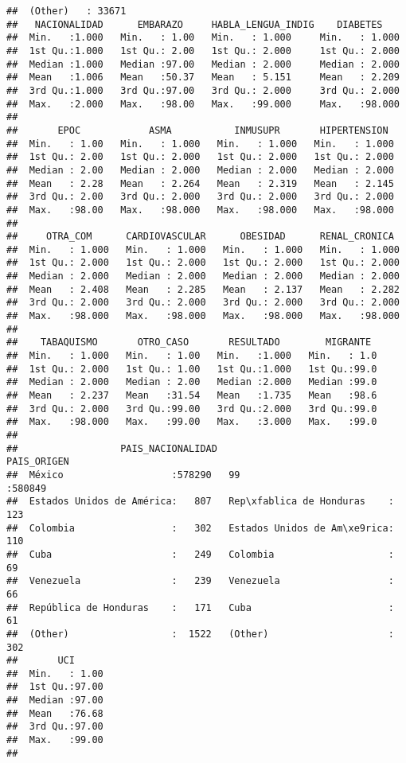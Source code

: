 \documentclass[]{article}
\begin{document}
\begin{verbatim}
##  (Other)   : 33671                                                    
##   NACIONALIDAD      EMBARAZO     HABLA_LENGUA_INDIG    DIABETES     
##  Min.   :1.000   Min.   : 1.00   Min.   : 1.000     Min.   : 1.000  
##  1st Qu.:1.000   1st Qu.: 2.00   1st Qu.: 2.000     1st Qu.: 2.000  
##  Median :1.000   Median :97.00   Median : 2.000     Median : 2.000  
##  Mean   :1.006   Mean   :50.37   Mean   : 5.151     Mean   : 2.209  
##  3rd Qu.:1.000   3rd Qu.:97.00   3rd Qu.: 2.000     3rd Qu.: 2.000  
##  Max.   :2.000   Max.   :98.00   Max.   :99.000     Max.   :98.000  
##                                                                     
##       EPOC            ASMA           INMUSUPR       HIPERTENSION   
##  Min.   : 1.00   Min.   : 1.000   Min.   : 1.000   Min.   : 1.000  
##  1st Qu.: 2.00   1st Qu.: 2.000   1st Qu.: 2.000   1st Qu.: 2.000  
##  Median : 2.00   Median : 2.000   Median : 2.000   Median : 2.000  
##  Mean   : 2.28   Mean   : 2.264   Mean   : 2.319   Mean   : 2.145  
##  3rd Qu.: 2.00   3rd Qu.: 2.000   3rd Qu.: 2.000   3rd Qu.: 2.000  
##  Max.   :98.00   Max.   :98.000   Max.   :98.000   Max.   :98.000  
##                                                                    
##     OTRA_COM      CARDIOVASCULAR      OBESIDAD      RENAL_CRONICA   
##  Min.   : 1.000   Min.   : 1.000   Min.   : 1.000   Min.   : 1.000  
##  1st Qu.: 2.000   1st Qu.: 2.000   1st Qu.: 2.000   1st Qu.: 2.000  
##  Median : 2.000   Median : 2.000   Median : 2.000   Median : 2.000  
##  Mean   : 2.408   Mean   : 2.285   Mean   : 2.137   Mean   : 2.282  
##  3rd Qu.: 2.000   3rd Qu.: 2.000   3rd Qu.: 2.000   3rd Qu.: 2.000  
##  Max.   :98.000   Max.   :98.000   Max.   :98.000   Max.   :98.000  
##                                                                     
##    TABAQUISMO       OTRO_CASO       RESULTADO        MIGRANTE   
##  Min.   : 1.000   Min.   : 1.00   Min.   :1.000   Min.   : 1.0  
##  1st Qu.: 2.000   1st Qu.: 1.00   1st Qu.:1.000   1st Qu.:99.0  
##  Median : 2.000   Median : 2.00   Median :2.000   Median :99.0  
##  Mean   : 2.237   Mean   :31.54   Mean   :1.735   Mean   :98.6  
##  3rd Qu.: 2.000   3rd Qu.:99.00   3rd Qu.:2.000   3rd Qu.:99.0  
##  Max.   :98.000   Max.   :99.00   Max.   :3.000   Max.   :99.0  
##                                                                 
##                  PAIS_NACIONALIDAD                        PAIS_ORIGEN    
##  México                   :578290   99                          :580849  
##  Estados Unidos de América:   807   Rep\xfablica de Honduras    :   123  
##  Colombia                 :   302   Estados Unidos de Am\xe9rica:   110  
##  Cuba                     :   249   Colombia                    :    69  
##  Venezuela                :   239   Venezuela                   :    66  
##  República de Honduras    :   171   Cuba                        :    61  
##  (Other)                  :  1522   (Other)                     :   302  
##       UCI       
##  Min.   : 1.00  
##  1st Qu.:97.00  
##  Median :97.00  
##  Mean   :76.68  
##  3rd Qu.:97.00  
##  Max.   :99.00  
## 
\end{verbatim}
\end{document}
